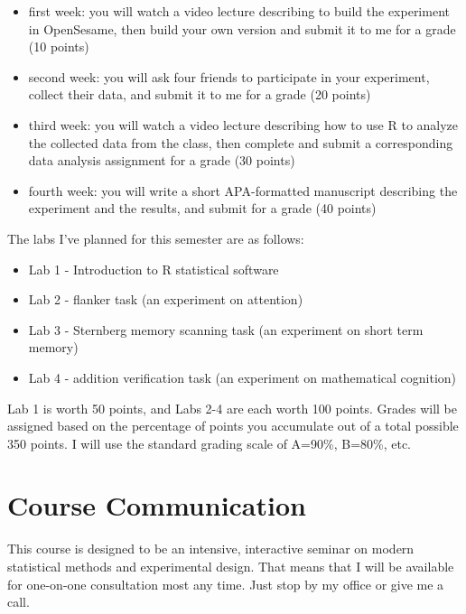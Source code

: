 \documentclass[10pt]{article}
\begin{document}
\begin{itemize}
\item first week: you will watch a video lecture describing to build the experiment in OpenSesame, then build your own version and submit it to me for a grade (10 points)
\item second week: you will ask four friends to participate in your experiment, collect their data, and submit it to me for a grade (20 points)
\item third week: you will watch a video lecture describing how to use R to analyze the collected data from the class, then complete and submit a corresponding data analysis assignment for a grade (30 points)
\item fourth week: you will write a short APA-formatted manuscript describing the experiment and the results, and submit for a grade (40 points)
\end{itemize}

The labs I've planned for this semester are as follows:

\begin{itemize}
\item Lab 1 - Introduction to R statistical software
\item Lab 2 - flanker task (an experiment on attention)
\item Lab 3 - Sternberg memory scanning task (an experiment on short term memory)
\item Lab 4 - addition verification task (an experiment on mathematical cognition)
\end{itemize}

Lab 1 is worth 50 points, and Labs 2-4 are each worth 100 points. Grades will be assigned based on the percentage of points you accumulate out of a total possible 350 points.  I will use the standard grading scale of A=90\%, B=80\%, etc.

\section*{Course Communication}
\label{sec:org6c49705}

This course is designed to be an intensive, interactive seminar on modern statistical methods and experimental design.  That means that I will be available for one-on-one consultation most any time.  Just stop by my office or give me a call.
\end{document}
